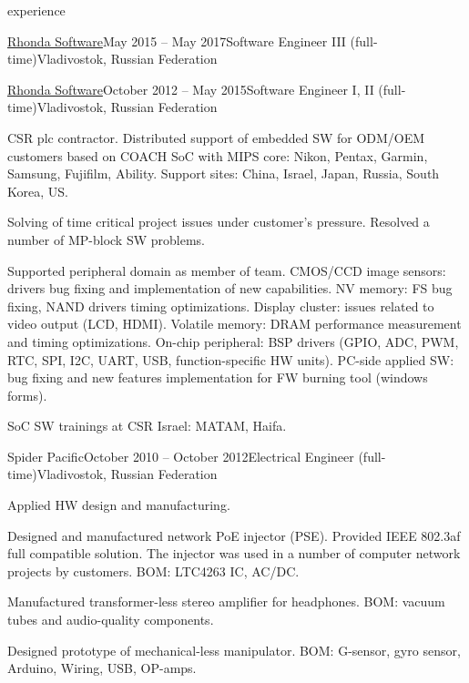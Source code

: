 \documentclass{template}
\begin{document}
\begin{rSection}{experience}
\begin{rCompany}{\href{http://www.rhondasoftware.com}{Rhonda Software}}{May 2015 -- May 2017}{Software Engineer III (full-time)}{Vladivostok, Russian Federation}
\end{rCompany}
\begin{rCompany}{\href{http://www.rhondasoftware.com}{Rhonda Software}}{October 2012 -- May 2015}{Software Engineer I, II (full-time)}{Vladivostok, Russian Federation}

\item CSR plc contractor. Distributed support of embedded SW for ODM/OEM customers based on COACH SoC with MIPS core:
      Nikon, Pentax, Garmin, Samsung, Fujifilm, Ability. Support sites: China, Israel, Japan, Russia, South Korea, US.
\item Solving of time critical project issues under customer's pressure. Resolved a number of MP-block SW problems.
\item Supported peripheral domain as member of team. CMOS/CCD image sensors: drivers bug fixing and implementation of new capabilities.
      NV memory: FS bug fixing, NAND drivers timing optimizations. Display cluster: issues related to video output (LCD, HDMI). Volatile memory:
      DRAM performance measurement and timing optimizations. On-chip peripheral: BSP drivers (GPIO, ADC, PWM, RTC, SPI, I2C, UART, USB, function-specific HW units).
      PC-side applied SW: bug fixing and new features implementation for FW burning tool (windows forms).
\item SoC SW trainings at CSR Israel: MATAM, Haifa.

\end{rCompany}
\begin{rCompany}{Spider Pacific}{October 2010 -- October 2012}{Electrical Engineer (full-time)}{Vladivostok, Russian Federation}

\item Applied HW design and manufacturing.
\item Designed and manufactured network PoE injector (PSE). Provided IEEE 802.3af full compatible solution. \newline
      The injector was used in a number of computer network projects by customers. BOM: LTC4263 IC, AC/DC.
\item Manufactured transformer-less stereo amplifier for headphones. BOM: vacuum tubes and audio-quality components.
\item Designed prototype of mechanical-less manipulator. BOM: G-sensor, gyro sensor, Arduino, Wiring, USB, OP-amps.


\end{rCompany}
\end{rSection}
\end{document}
